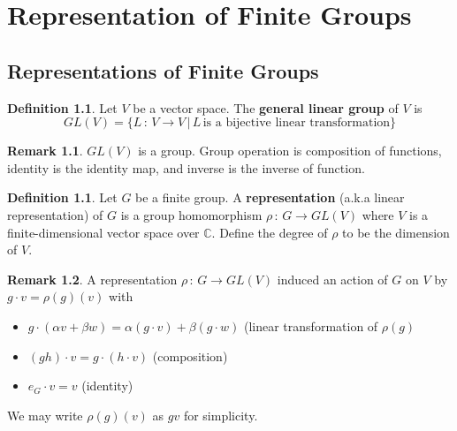 \documentclass{book}
\newcommand{\C}{\mathbb{C}}
\newcommand{\define}[1]{\textbf{#1}}
\theoremstyle{definition}
\newtheorem{definition}[lemma]{Definition}
\theoremstyle{remarkstyle}
\newtheorem*{remark}{Remark}%
\begin{document}
\setcounter{chapter}{5}
\chapter{Representation of Finite Groups}



\section{Representations of Finite Groups}
\begin{definition}
    Let $V$ be a vector space. The \define{general linear group} of $V$ is
    $$
    GL(V) = \{L\,:\,V\rightarrow V\,\lvert\, L\,\textrm{is a bijective linear transformation}\}
    $$
\end{definition}
\begin{remark}
    $GL(V)$ is a group. Group operation is composition of functions, identity is the identity map, and inverse is the inverse of function. \newline
\end{remark}

\begin{definition}
    Let $G$ be a finite group. A \define{representation} (a.k.a linear representation) of $G$ is a group homomorphism $\rho \,:\, G\rightarrow GL(V)$ where $V$ is a finite-dimensional vector space over $\C$. Define the degree of $\rho$ to be the dimension of $V$.
\end{definition}
\begin{remark}
 A representation $\rho\,:\, G\rightarrow GL(V)$ induced an action of $G$ on $V$ by $g\cdot v=\rho(g)(v)$ with 
        \begin{itemize}
            \item $g\cdot(\alpha v + \beta w) = \alpha(g\cdot v) + \beta(g \cdot w) $ (linear transformation of $\rho(g)$
            \item $(gh)\cdot v = g\cdot(h\cdot v) $ (composition)
            \item $e_G\cdot v=v$ (identity)
        \end{itemize}
        We may write $\rho(g)(v)$ as $gv$ for simplicity. \newline

\end{remark}
\end{document}
